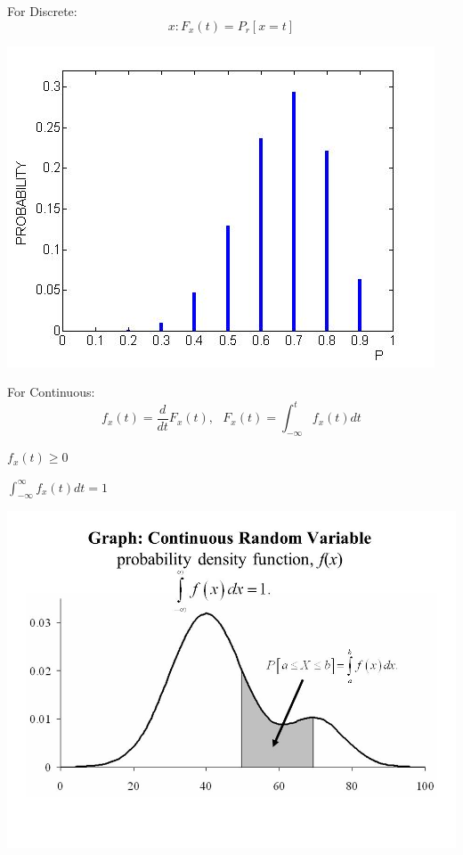 \documentclass{article}
\begin{document}
{{{            \begin{enumerate}{
                \item For Discrete:
                    \[ x: F_x(t)= P_r[x= t] \]
                    \begin{center}{
                        \includegraphics[scale=0.3]{dis-pdf.jpg}
                    }
                    \end{center}
                \item For Continuous: 
                    \[ f_x(t) = \frac{d}{dt}F_x(t), \text{ } F_x(t)=\int_{-\infty}^{t}f_x(t)dt \]
                    \begin{enumerate}[i]{
                        \item $f_x(t)\ge 0$
                        \item $\int_{-\infty}^{\infty}f_x(t)dt= 1$
                    }
                    \end{enumerate}

                    \begin{center}{
                        \includegraphics[scale=0.3]{con-pdf.jpg}
                    }
                    \end{center}
            }
            \end{enumerate}  
        }
    }
}
\end{document}
